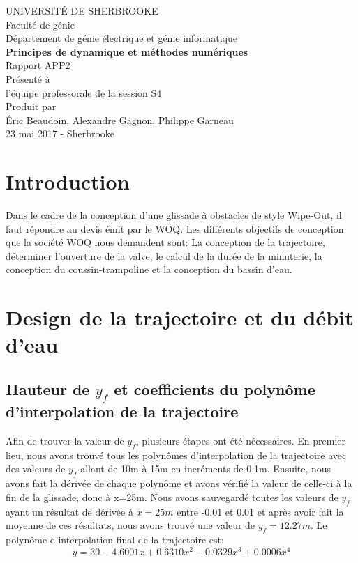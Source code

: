 \documentclass{article}
\begin{document}
\begin{titlepage}   
	\large{
		\begin{center}
			UNIVERSITÉ DE SHERBROOKE\\Faculté de génie\\
			Département de génie électrique et génie informatique\\
			\vspace{3cm}
			{\LARGE\textbf{Principes de dynamique et méthodes numériques}}\\
			\vspace{2cm}
			\LARGE{Rapport APP2}\\
			\vspace{2cm}
			Présenté à\\l'équipe professorale de la session S4\\
			\vspace{2cm}
			Produit par\\Éric Beaudoin, Alexandre Gagnon, Philippe Garneau\\
			\vspace{1cm}
			\vfill{23 mai 2017 - Sherbrooke}
		\end{center}
	}
\end{titlepage}
\newpage
\tableofcontents

\newpage
\section{Introduction}
Dans le cadre de la conception d'une glissade à obstacles de style Wipe-Out, il faut répondre au devis émit par le WOQ. Les différents objectifs de conception que la société WOQ nous demandent sont: La conception de la trajectoire, déterminer l'ouverture de la valve, le calcul de la durée de la minuterie, la conception du coussin-trampoline et la conception du bassin d'eau. 

\section{Design de la trajectoire et du débit d'eau}
\subsection{Hauteur de $y_f$ et coefficients du polynôme d'interpolation de la trajectoire}
Afin de trouver la valeur de $y_f$, plusieurs étapes ont été nécessaires. En premier lieu, nous avons trouvé tous les polynômes d'interpolation de la trajectoire avec des valeurs de $y_f$ allant de 10m à 15m en incréments de 0.1m. Ensuite, nous avons fait la dérivée de  chaque polynôme et avons vérifié la valeur de celle-ci à la fin de la glissade, donc à x=25m. Nous avons sauvegardé toutes les valeurs de $y_f$ ayant un résultat de dérivée à $x=25m$ entre -0.01 et 0.01 et après avoir fait la moyenne de ces résultats, nous avons trouvé une valeur de $y_f=12.27m$. Le polynôme d'interpolation final de la trajectoire est:
\begin{equation}
y = 30-4.6001x+0.6310x^2-0.0329x^3+0.0006x^4
\end{equation}
\end{document}
